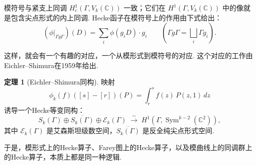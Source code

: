 \documentclass[10pt,UTF8]{ctexart}
\newcommand{\C}{\mathbb{C}}
\theoremstyle{definition}
\newtheorem{theorem}{定理}[section]
\theoremstyle{remark}
\begin{document}
模符号与紧支上同调 $H^1_c(\Gamma, V_k(\C))$ 一致；它们在 $H^1(\Gamma, V_k(\C))$ 中的像就是包含尖点形式的内上同调. Hecke函子在模符号上的作用由下式给出：
\[
(\phi|_{\Gamma g\Gamma})(D) = \sum_i \phi(g_i D)\cdot g_i \qquad (\Gamma g\Gamma = \bigsqcup_i \Gamma g_i).
\]

这样，就会有一个有趣的对应，一个从模形式到模符号的对应. 这个对应的工作由Eichler–Shimura在1959年给出\cite{shimura1959}.

\begin{theorem}[Eichler–Shimura同构]
映射
\[
\phi_k(f)([s]-[r])(P) = \int_r^s f(z)\, P(z,1)\, dz
\]
诱导一个Hecke等变同构：
\[
S_k(\Gamma) \oplus \overline{S_k(\Gamma)} \oplus \mathcal{E}_k(\Gamma) \;\stackrel{\sim}{\longrightarrow}\; H^1(\Gamma, \operatorname{Sym}^{k-2}(\C^2)),
\]
其中 $\mathcal{E}_k(\Gamma)$ 是艾森斯坦级数空间，$\overline{S_k(\Gamma)}$ 是反全纯尖点形式空间. 
\end{theorem}

于是，模形式上的Hecke算子、Farey图上的Hecke算子，以及模曲线上的同调群上的Hecke算子，本质上都是同一种逻辑. 
\newpage

       
\end{document}
